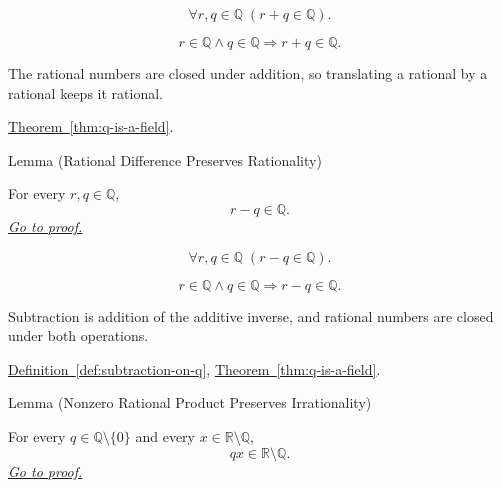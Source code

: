 \begin{remark*}
\[
\forall r,q\in\mathbb{Q}\;(r+q\in\mathbb{Q}).
\]
\end{remark*}

\begin{remark*}
\[
r\in\mathbb{Q}\land q\in\mathbb{Q}\Longrightarrow r+q\in\mathbb{Q}.
\]
\end{remark*}

\begin{remark*}[Interpretation]
The rational numbers are closed under addition, so translating a rational by a
rational keeps it rational.
\end{remark*}

\begin{dependencies}
\hyperref[thm:q-is-a-field]{Theorem~\ref*{thm:q-is-a-field}}.
\end{dependencies}

\begin{lemmabox}{Lemma (Rational Difference Preserves Rationality)}
\begin{lemma}
\label{lem:rational-difference-preserves-rationality}
For every $r,q\in\mathbb{Q}$,
\[
  r-q\in\mathbb{Q}.
\]
\hyperref[prf:rational-difference-preserves-rationality]{\textit{Go to proof.}}
\end{lemma}
\end{lemmabox}

\begin{remark*}
\[
\forall r,q\in\mathbb{Q}\;(r-q\in\mathbb{Q}).
\]
\end{remark*}

\begin{remark*}
\[
r\in\mathbb{Q}\land q\in\mathbb{Q}\Longrightarrow r-q\in\mathbb{Q}.
\]
\end{remark*}

\begin{remark*}[Interpretation]
Subtraction is addition of the additive inverse, and rational numbers are
closed under both operations.
\end{remark*}

\begin{dependencies}
\hyperref[def:subtraction-on-q]{Definition~\ref*{def:subtraction-on-q}},
\hyperref[thm:q-is-a-field]{Theorem~\ref*{thm:q-is-a-field}}.
\end{dependencies}

\begin{lemmabox}{Lemma (Nonzero Rational Product Preserves Irrationality)}
\begin{lemma}
\label{lem:nonzero-rational-product-preserves-irrationality}
For every $q\in\mathbb{Q}\setminus\{0\}$ and every
$x\in\mathbb{R}\setminus\mathbb{Q}$,
\[
  qx\in\mathbb{R}\setminus\mathbb{Q}.
\]
\hyperref[prf:nonzero-rational-product-preserves-irrationality]{\textit{Go to proof.}}
\end{lemma}
\end{lemmabox}

